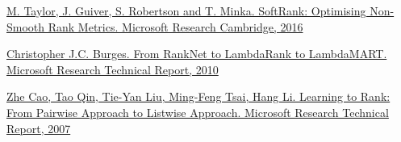 \documentclass[14pt,a4paper]{amsart}
\theoremstyle{definition}
\theoremstyle{definition}
\begin{document}
\begin{thebibliography}{1}

 \href{https://www.microsoft.com/en-us/research/publication/softrank-optimising-non-smooth-rank-metrics/}
{M. Taylor, J. Guiver, S. Robertson and T. Minka. SoftRank: Optimising Non-Smooth Rank Metrics. Microsoft Research Cambridge, 2016}

 \href{https://www.microsoft.com/en-us/research/publication/from-ranknet-to-lambdarank-to-lambdamart-an-overview/}
{Christopher J.C. Burges. From RankNet to LambdaRank to LambdaMART. Microsoft Research Technical Report, 2010}

 \href{https://www.microsoft.com/en-us/research/publication/learning-to-rank-from-pairwise-approach-to-listwise-approach/}
{Zhe Cao, Tao Qin, Tie-Yan Liu, Ming-Feng Tsai, Hang Li. Learning to Rank: From Pairwise Approach to Listwise Approach. Microsoft Research Technical Report, 2007}

\end{thebibliography}

\vspace{0.7cm}
\end{document}
